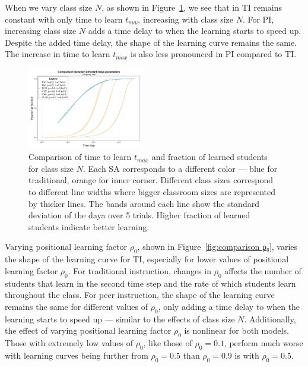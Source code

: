 \documentclass[twocolumn,secnumarabic,amssymb, nobibnotes, aps, prd]{revtex4-2}
\begin{document}
        When we vary class size $N$, as shown in Figure~\ref{fig:comparison size}, we see that in TI remains constant with only time to learn $t_{max}$ increasing with class size $N$.
        For PI, increasing class size $N$ adds a time delay to when the learning starts to speed up. Despite the added time delay, the shape of the learning curve remains the same.
        The increase in time to learn $t_{max}$ is also less pronounced in PI compared to TI.

        \begin{figure}[htbp!]
            \centering
            \includegraphics[width=0.45\textwidth]{figures/2D-BPCAIH-analysis/comparison plots/size.png}
            \caption{Comparison of time to learn $t_{max}$ and fraction of learned students for class size $N$.
            Each SA corresponds to a different color --- blue for traditional, orange for inner corner.
            Different class sizes correspond to different line widths where bigger classroom sizes are represented by thicker lines.
            The bands around each line show the standard deviation of the daya over 5 trials.
            Higher fraction of learned students indicate better learning.}
            \label{fig:comparison size}
        \end{figure}

        Varying positional learning factor $\rho_0$, shown in Figure~\ref{fig:comparison ρ₀}, varies the shape of the learning curve for TI, especially for lower values of positional learning factor $\rho_0$.
        For traditional instruction, changes in $\rho_0$ affects the number of students that learn in the second time step and the rate of which students learn throughout the class.
        For peer instruction, the shape of the learning curve remains the same for different values of $\rho_0$, only adding a time delay to when the learning starts to speed up --- similar to the effects of class size $N$.
        Additionally, the effect of varying positional learning factor $\rho_0$ is nonlinear for both models. Those with extremely low values of $\rho_0$, like those of $\rho_0=0.1$, perform much worse with learning curves being further from $\rho_0=0.5$ than $\rho_0=0.9$ is with $\rho_0=0.5$.
\end{document}
